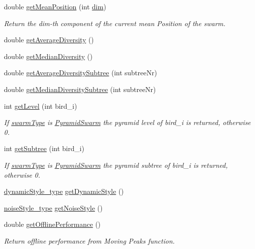 \begin{CompactItemize}
double \hyperlink{classPSO_0bfc18361a99c875cd88c928accbd820}{getMeanPosition} (int \hyperlink{classPSO_4f1ce768b59640f64ed2b270764b32b1}{dim})
\begin{CompactList}\small\item\em Return the dim-th component of the current mean Position of the swarm. \item\end{CompactList}\item 
double \hyperlink{classPSO_cfa32c9b4b8d07a56dc4a145fa5534fd}{getAverageDiversity} ()
\item 
double \hyperlink{classPSO_01973b6f01724ab7bee92341f10dfc76}{getMedianDiversity} ()
\item 
double \hyperlink{classPSO_4f78ee083a3653329aea7faaf086af1b}{getAverageDiversitySubtree} (int subtreeNr)
\item 
double \hyperlink{classPSO_be9ebcc8c0b943ad7c03212d9f7486c2}{getMedianDiversitySubtree} (int subtreeNr)
\item 
int \hyperlink{classPSO_c29458ae9af544902866955fe9c0c009}{getLevel} (int bird\_\-i)
\begin{CompactList}\small\item\em If \hyperlink{classPSO_ab45164d2c0f86041d014fa51ebb78b5}{swarmType} is \hyperlink{classPyramidSwarm}{PyramidSwarm} the pyramid level of bird\_\-i is returned, otherwise 0. \item\end{CompactList}\item 
int \hyperlink{classPSO_a7fa2ebaf0bc46e343ebfa29d539f800}{getSubtree} (int bird\_\-i)
\begin{CompactList}\small\item\em If \hyperlink{classPSO_ab45164d2c0f86041d014fa51ebb78b5}{swarmType} is \hyperlink{classPyramidSwarm}{PyramidSwarm} the pyramid subtree of bird\_\-i is returned, otherwise 0. \item\end{CompactList}\item 
\hyperlink{optfunctions_8h_ae9aa3a5dd199a43e77abc2cccf4477e}{dynamicStyle\_\-type} \hyperlink{classPSO_b39abf541d9a73383613ebc507f07a2c}{getDynamicStyle} ()
\item 
\hyperlink{optfunctions_8h_b2443d91d959f9b3a033d74864a28862}{noiseStyle\_\-type} \hyperlink{classPSO_f76be383f4e2360d2de466eeb6955af1}{getNoiseStyle} ()
\item 
double \hyperlink{classPSO_41f18c5343c03219fe81915cd73b8f33}{getOfflinePerformance} ()
\begin{CompactList}\small\item\em Return offline performance from Moving Peaks function. \item\end{CompactList}\item 

\end{CompactItemize}
